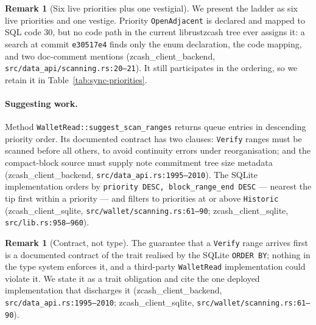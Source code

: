 \documentclass[11pt,a4paper]{article}
\theoremstyle{definition}
\newtheorem{remark}[theorem]{Remark}
\begin{document}
\begin{remark}[Six live priorities plus one vestigial]
\label{rem:sync-openadjacent}
We present the ladder as six live priorities and one vestige. Priority
\texttt{OpenAdjacent} is declared and mapped to SQL code $30$, but no code
path in the current \textsf{librustzcash} tree ever assigns it: a search at
commit \texttt{e30517e4} finds only the enum declaration, the code mapping,
and two doc-comment mentions
(\textsf{zcash\_client\_backend}, \texttt{src/data\_api/scanning.rs:20--21}). It
still participates in the ordering, so we retain it in
Table~\ref{tab:sync-priorities}.
\end{remark}

\paragraph{Suggesting work.} Method \texttt{WalletRead::suggest\_scan\_ranges}
returns queue entries in descending priority order. Its documented contract
has two clauses: \texttt{Verify} ranges must be scanned before all others,
to avoid continuity errors under reorganisation; and the compact-block
source must supply note commitment tree size metadata
(\textsf{zcash\_client\_backend}, \texttt{src/data\_api.rs:1995--2010}). The
SQLite
implementation orders by \texttt{priority DESC, block\_range\_end DESC} ---
nearest the tip first within a priority --- and filters to priorities at or
above \texttt{Historic}
(\textsf{zcash\_client\_sqlite}, \texttt{src/wallet/scanning.rs:61--90};
\textsf{zcash\_client\_sqlite}, \texttt{src/lib.rs:958--960}).

\begin{remark}[Contract, not type]\label{rem:sync-verify-first}
The guarantee that a \texttt{Verify} range arrives first is a documented
contract of the trait realised by the SQLite \texttt{ORDER BY}; nothing in
the type system enforces it, and a third-party \texttt{WalletRead}
implementation could violate it. We state it as a trait obligation and cite
the one deployed implementation that discharges it
(\textsf{zcash\_client\_backend}, \texttt{src/data\_api.rs:1995--2010};
\textsf{zcash\_client\_sqlite}, \texttt{src/wallet/scanning.rs:61--90}).
\end{remark}
\end{document}
